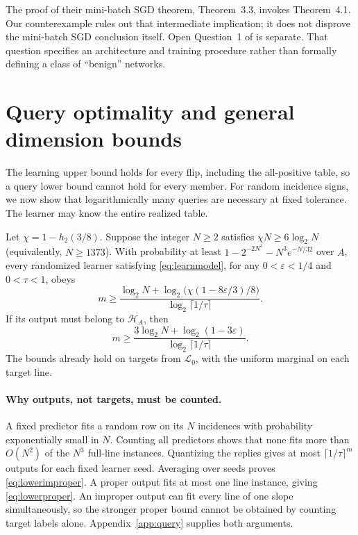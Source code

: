 \documentclass[11pt,letterpaper,pmlr,twoside]{jmlr}
\newcommand{\Hc}{\mathcal H}
\newcommand{\Lc}{\mathcal L}
\newcommand{\eps}{\varepsilon}
\newcommand{\ceil}[1]{\lceil #1\rceil}
\newcommand{\hbin}{h_2}
\begin{document}
The proof of their mini-batch SGD theorem, Theorem~3.3, invokes Theorem~4.1. Our counterexample rules out that intermediate implication; it does not disprove the mini-batch SGD conclusion itself. Open Question~1 of \citet{FKS26} is separate. That question specifies an architecture and training procedure rather than formally defining a class of ``benign'' networks.

\section{Query optimality and general dimension bounds}\label{sec:optimality}
The learning upper bound holds for every flip, including the all-positive table, so a query lower bound cannot hold for every member. For random incidence signs, we now show that logarithmically many queries are necessary at fixed tolerance. The learner may know the entire realized table.

\begin{theorem}\label{thm:querylower}
Let $\chi=1-\hbin(3/8)$. Suppose the integer $N\ge2$ satisfies $\chi N\ge6\log_2N$ (equivalently, $N\ge1373$). With probability at least $1-2^{-2N^3}-N^3e^{-N/32}$ over $A$, every randomized learner satisfying \eqref{eq:learnmodel}, for any $0<\eps<1/4$ and $0<\tau<1$, obeys
\begin{equation}
 m\ge\frac{\log_2 N+\log_2\!\bigl(\chi(1-8\eps/3)/8\bigr)}{\log_2\ceil{1/\tau}}.
 \label{eq:lowerimproper}
\end{equation}
If its output must belong to $\Hc_A$, then
\begin{equation}
 m\ge\frac{3\log_2 N+\log_2(1-3\eps)}{\log_2\ceil{1/\tau}}.
 \label{eq:lowerproper}
\end{equation}
The bounds already hold on targets from $\Lc_0$, with the uniform marginal on each target line.
\end{theorem}

\paragraph{Why outputs, not targets, must be counted.}
A fixed predictor fits a random row on its $N$ incidences with probability exponentially small in $N$. Counting all predictors shows that none fits more than $O(N^2)$ of the $N^3$ full-line instances. Quantizing the replies gives at most $\ceil{1/\tau}^m$ outputs for each fixed learner seed. Averaging over seeds proves \eqref{eq:lowerimproper}. A proper output fits at most one line instance, giving \eqref{eq:lowerproper}. An improper output can fit every line of one slope simultaneously, so the stronger proper bound cannot be obtained by counting target labels alone. Appendix~\ref{app:query} supplies both arguments.
\end{document}
